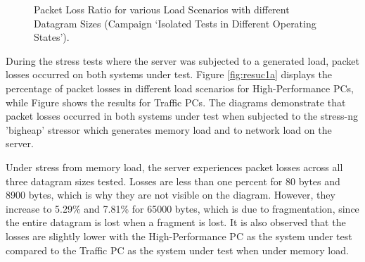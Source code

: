 \begin{figure}[h!]
  \centering
  \caption{Packet Loss Ratio for various Load Scenarios with different Datagram Sizes (Campaign `Isolated Tests in Different Operating States').}
  \label{fig:resuc1}
\end{figure}

During the stress tests where the server was subjected to a generated load, packet losses occurred on both systems under test. Figure \ref{fig:resuc1a} displays the percentage of packet losses in different load scenarios for High-Performance PCs, while Figure \label{fig:resuc1b} shows the results for Traffic PCs. The diagrams demonstrate that packet losses occurred in both systems under test when subjected to the stress-ng 'bigheap' stressor which generates memory load and to network load on the server.

Under stress from memory load, the server experiences packet losses across all three datagram sizes tested. Losses are less than one percent for 80 bytes and 8900 bytes, which is why they are not visible on the diagram. However, they increase to 5.29\% and 7.81\% for 65000 bytes, which is due to fragmentation, since the entire datagram is lost when a fragment is lost. It is also observed that the losses are slightly lower with the High-Performance PC as the system under test compared to the Traffic PC as the system under test when under memory load.


